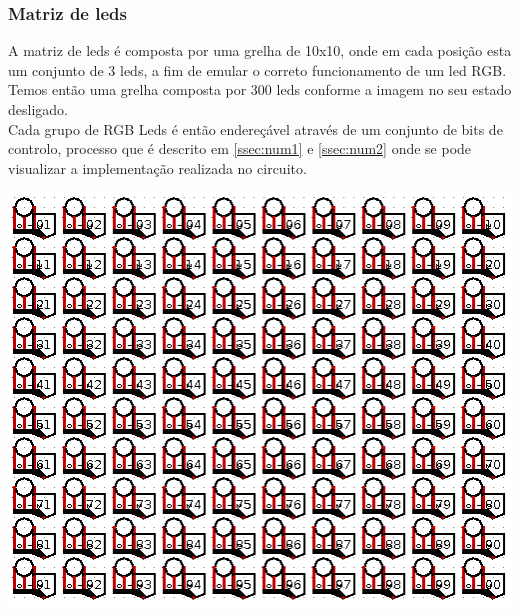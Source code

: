 \documentclass[12pt,a4paper,portrait]{article}
\begin{document}
			\subsubsection{Matriz de leds}
				\begin{minipage}{1.1\textwidth}
					\begin{minipage}[b]{0.49\textwidth}
						A matriz de leds é composta por uma grelha de 10x10, onde em cada posição esta um conjunto de 3 leds, a fim de emular o correto funcionamento de um led RGB.\\
						Temos então uma grelha composta por 300 leds conforme a imagem no seu estado desligado.\\
						Cada grupo de RGB Leds é então endereçável através de um conjunto de bits de controlo, processo que é descrito em \ref{ssec:num1} e \ref{ssec:num2} onde se pode visualizar a implementação realizada no circuito.
					\end{minipage}
					\hfill
					\begin{minipage}[b]{0.49\textwidth}
						\centering
						\includegraphics[width=1.0\textwidth]{imagens/ledmatrix}
					\end{minipage}
				\end{minipage}\\
\end{document}

